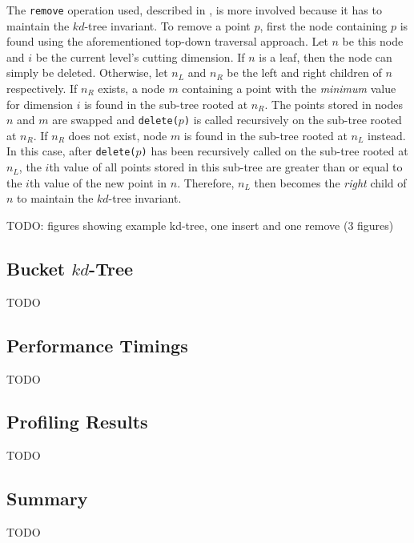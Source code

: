 The \texttt{remove} operation used, described in \cite{kdtree-remove}, is more involved because it has to maintain the $kd$-tree invariant. To remove a point $p$, first the node containing $p$ is found using the aforementioned top-down traversal approach. Let $n$ be this node and $i$ be the current level's cutting dimension. If $n$ is a leaf, then the node can simply be deleted. Otherwise, let $n_L$ and $n_R$ be the left and right children of $n$ respectively. If $n_R$ exists, a node $m$ containing a point with the \textit{minimum} value for dimension $i$ is found in the sub-tree rooted at $n_R$. The points stored in nodes $n$ and $m$ are swapped and \texttt{delete($p$)} is called recursively on the sub-tree rooted at $n_R$. If $n_R$ does not exist, node $m$ is found in the sub-tree rooted at $n_L$ instead. In this case, after \texttt{delete($p$)} has been recursively called on the sub-tree rooted at $n_L$, the $i$th value of all points stored in this sub-tree are greater than or equal to the $i$th value of the new point in $n$. Therefore, $n_L$ then becomes the \textit{right} child of $n$ to maintain the $kd$-tree invariant.

TODO: figures showing example kd-tree, one insert and one remove (3 figures)

\subsection{Bucket $kd$-Tree}

TODO

\subsection{Performance Timings}

TODO

\subsection{Profiling Results}

TODO

\subsection{Summary}

TODO